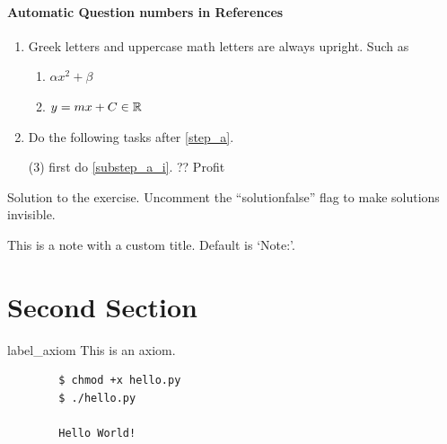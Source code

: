 \documentclass{worksheet}
\begin{document}
    \paragraph{Automatic Question numbers in References}
    \begin{enumerate}
        \item Greek letters and uppercase math letters are always upright. Such as \label{step_a}
        \begin{enumerate}
            \item  $\alpha x^2 +\beta$ \label{substep_a_i} 
            \item  $y =mx+ C \in \mathbb{R}$ 
        \end{enumerate}
   
        \item Do the  following tasks after \ref{step_a}.
        \begin{tasks}(3)
        \task first do \ref{substep_a_i}.
        \task ??    
        \task Profit
        \end{tasks}
    \end{enumerate}
    
    
    \begin{solution}
    Solution to the exercise. Uncomment the ``solutionfalse'' flag to make solutions invisible.
    \end{solution}
    
    
    \begin{note}
	This is a note with a custom title. Default is `Note:'.
	\end{note}
	
	
    
	\section{Second Section}
	
	\begin{axiom}{label_axiom}
	This is an axiom.
	\end{axiom}
	
	
	
    \begin{code}[Code:]
    \begin{verbatim}
    	$ chmod +x hello.py
    	$ ./hello.py
    	
    	Hello World!
    \end{verbatim}
    \end{code}
	
\end{document}
